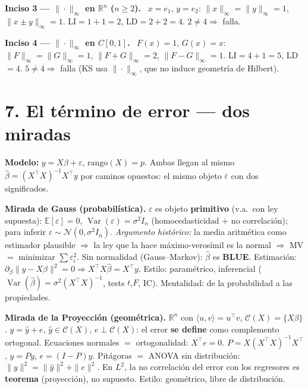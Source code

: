 \documentclass[11pt]{article}
\newcommand{\E}{\mathbb{E}}
\newcommand{\R}{\mathbb{R}}
\newcommand{\Var}{\operatorname{Var}}
\newcommand{\inc}[1]{\smallskip\noindent\textbf{\color{blue!30!black}#1}\ }
\begin{document}
\inc{Inciso 3 — $\|\cdot\|_\infty$ en $\R^n$ ($n\ge2$).} $x=e_1$, $y=e_2$: $\|x\|_\infty=\|y\|_\infty=1$,
$\|x\pm y\|_\infty=1$. LI$=1+1=2$, LD$=2+2=4$. $2\neq4\Rightarrow$ falla.

\inc{Inciso 4 — $\|\cdot\|_\infty$ en $C[0,1]$.} $F(x)=1$, $G(x)=x$: $\|F\|_\infty=\|G\|_\infty=1$,
$\|F+G\|_\infty=2$, $\|F-G\|_\infty=1$. LI$=4+1=5$, LD$=4$. $5\neq4\Rightarrow$ falla (KS usa $\|\cdot\|_\infty$,
que no induce geometría de Hilbert).

\section*{7. El término de error — dos miradas}
\textbf{Modelo:} $y=X\beta+\varepsilon$, $\mathrm{rango}(X)=p$. Ambas llegan al mismo
$\hat\beta=(X^\top X)^{-1}X^\top y$ por caminos opuestos: el mismo objeto $\varepsilon$ con dos significados.

\textbf{Mirada de Gauss (probabilística).} $\varepsilon$ es objeto \textbf{primitivo} (v.a.\ con ley supuesta):
$\E[\varepsilon]=0$, $\Var(\varepsilon)=\sigma^2 I_n$ (homocedasticidad + no correlación); para inferir
$\varepsilon\sim\mathcal N(0,\sigma^2I_n)$. \emph{Argumento histórico:} la media aritmética como estimador
plausible $\Rightarrow$ la ley que la hace máximo-verosímil es la normal $\Rightarrow$ MV $=$ minimizar
$\sum\varepsilon_i^2$. Sin normalidad (Gauss--Markov): $\hat\beta$ es \textbf{BLUE}. Estimación:
$\partial_\beta\|y-X\beta\|^2=0\Rightarrow X^\top X\hat\beta=X^\top y$. Estilo: paramétrico, inferencial
($\Var(\hat\beta)=\sigma^2(X^\top X)^{-1}$, tests $t$,$F$, IC). Mentalidad: de la probabilidad a las propiedades.

\textbf{Mirada de la Proyección (geométrica).} $\R^n$ con $\langle u,v\rangle=u^\top v$, $\mathcal C(X)=\{X\beta\}$.
$y=\hat y+e$, $\hat y\in\mathcal C(X)$, $e\perp\mathcal C(X)$: el error \textbf{se define} como complemento
ortogonal. Ecuaciones normales $=$ ortogonalidad: $X^\top e=0$. $P=X(X^\top X)^{-1}X^\top$, $\hat y=Py$,
$e=(I-P)y$. Pitágoras $=$ ANOVA sin distribución: $\|y\|^2=\|\hat y\|^2+\|e\|^2$. En $L^2$, la no correlación
del error con los regresores es \textbf{teorema} (proyección), no supuesto. Estilo: geométrico, libre de distribución.
\end{document}
